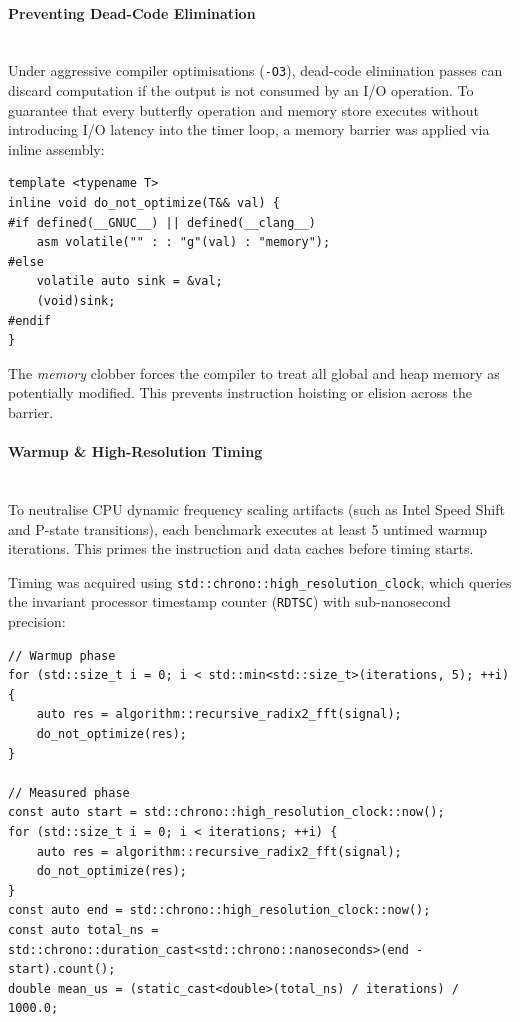 \documentclass{article}
\begin{document}
\paragraph{Preventing Dead-Code Elimination}~{}\\
Under aggressive compiler optimisations (\texttt{-O3}), dead-code elimination passes can discard computation if the output is not consumed by an I/O operation. To guarantee that every butterfly operation and memory store executes without introducing I/O latency into the timer loop, a memory barrier was applied via inline assembly:
\begin{lstlisting}[style=latte-cpp]
template <typename T>
inline void do_not_optimize(T&& val) {
#if defined(__GNUC__) || defined(__clang__)
    asm volatile("" : : "g"(val) : "memory");
#else
    volatile auto sink = &val;
    (void)sink;
#endif
}
\end{lstlisting}
The \textit{memory} clobber forces the compiler to treat all global and heap memory as potentially modified. This prevents instruction hoisting or elision across the barrier.

\paragraph{Warmup \& High-Resolution Timing}~{}\\
To neutralise CPU dynamic frequency scaling artifacts (such as Intel Speed Shift and P-state transitions), each benchmark executes at least 5 untimed warmup iterations. This primes the instruction and data caches before timing starts.

Timing was acquired using \texttt{std::chrono::high\_resolution\_clock}, which queries the invariant processor timestamp counter (\texttt{RDTSC}) with sub-nanosecond precision:
\begin{lstlisting}[style=latte-cpp]
// Warmup phase
for (std::size_t i = 0; i < std::min<std::size_t>(iterations, 5); ++i) {
    auto res = algorithm::recursive_radix2_fft(signal);
    do_not_optimize(res);
}

// Measured phase
const auto start = std::chrono::high_resolution_clock::now();
for (std::size_t i = 0; i < iterations; ++i) {
    auto res = algorithm::recursive_radix2_fft(signal);
    do_not_optimize(res);
}
const auto end = std::chrono::high_resolution_clock::now();
const auto total_ns = std::chrono::duration_cast<std::chrono::nanoseconds>(end - start).count();
double mean_us = (static_cast<double>(total_ns) / iterations) / 1000.0;
\end{lstlisting}
\end{document}
